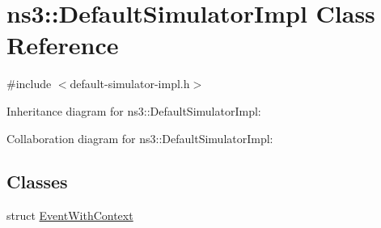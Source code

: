 \hypertarget{classns3_1_1DefaultSimulatorImpl}{}\section{ns3\+:\+:Default\+Simulator\+Impl Class Reference}
\label{classns3_1_1DefaultSimulatorImpl}


{\ttfamily \#include $<$default-\/simulator-\/impl.\+h$>$}



Inheritance diagram for ns3\+:\+:Default\+Simulator\+Impl\+:


Collaboration diagram for ns3\+:\+:Default\+Simulator\+Impl\+:
\subsection*{Classes}
\begin{DoxyCompactItemize}
\item 
struct \hyperlink{structns3_1_1DefaultSimulatorImpl_1_1EventWithContext}{Event\+With\+Context}
\end{DoxyCompactItemize}
